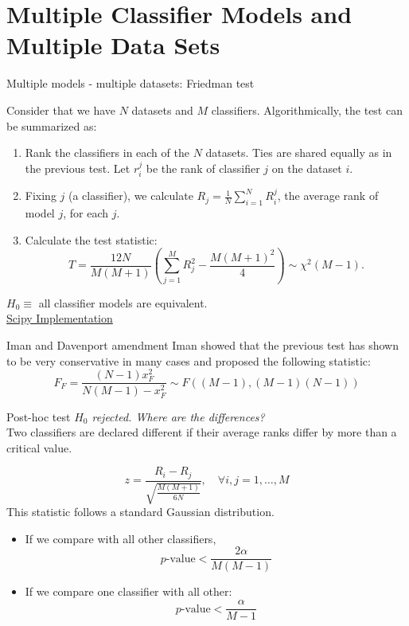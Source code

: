 \documentclass{beamer}
\begin{document}

\section{Multiple Classifier Models and Multiple Data Sets}
\begin{frame}{Multiple models - multiple datasets: Friedman test }

Consider that we have \(N\) datasets and \(M\) classifiers. Algorithmically, the test can be summarized as:
\begin{enumerate}
    \item Rank the classifiers in each of the \(N\) datasets. Ties are shared equally as in the previous test. Let \(r_i^j\) be the rank of classifier \(j\) on the dataset \(i\).
    \pause
    \item Fixing \(j\) (a classifier), we calculate \(R_j = \frac{1}{N} \sum_{i=1}^N R_i^j\), the average rank of model \(j\), for each \(j\).
    \pause
    \item Calculate the test statistic:
    \[
    T = \frac{12N}{M(M+1)} \left( \sum_{j=1}^M R_j^2 - \frac{M(M+1)^2}{4}\right) \sim \chi^2(M-1).
    \]
\end{enumerate}

    \pause
    \(H_0 \equiv\) all classifier models are equivalent.\\

    \href{https://docs.scipy.org/doc/scipy/reference/generated/scipy.stats.friedmanchisquare.html}{Scipy Implementation}


    
\end{frame}


\begin{frame}{Iman and Davenport amendment}
    Iman showed \citep{Iman1980} that the previous test has shown to be very conservative in many cases and proposed the following statistic:
    \[
    F_F = \frac{(N-1)x_F^2}{N(M-1)-x_F^2} \sim F\left((M-1), (M-1)(N-1)\right)
    \]
\end{frame}

\begin{frame}{Post-hoc test}
\emph{\(H_0\) rejected. Where are the differences?}\\

Two classifiers are declared different if their average ranks differ by more than a critical value.\\

\pause


\[
z = \frac{R_i - R_j}{\sqrt{\frac{M(M+1)}{6N}}}, \quad \forall i,j = 1, \dots, M
\]
\pause
This statistic follows a standard Gaussian distribution.
\begin{itemize}
    \item If we compare with all other classifiers, 
    \[
     p\text{-value}< \frac{2\alpha}{M(M-1)}
    \]
    \item If we compare one classifier with all other:
    \[
    p\text{-value}< \frac{\alpha}{M-1}
    \]
\end{itemize}

\end{frame}
\end{document}
